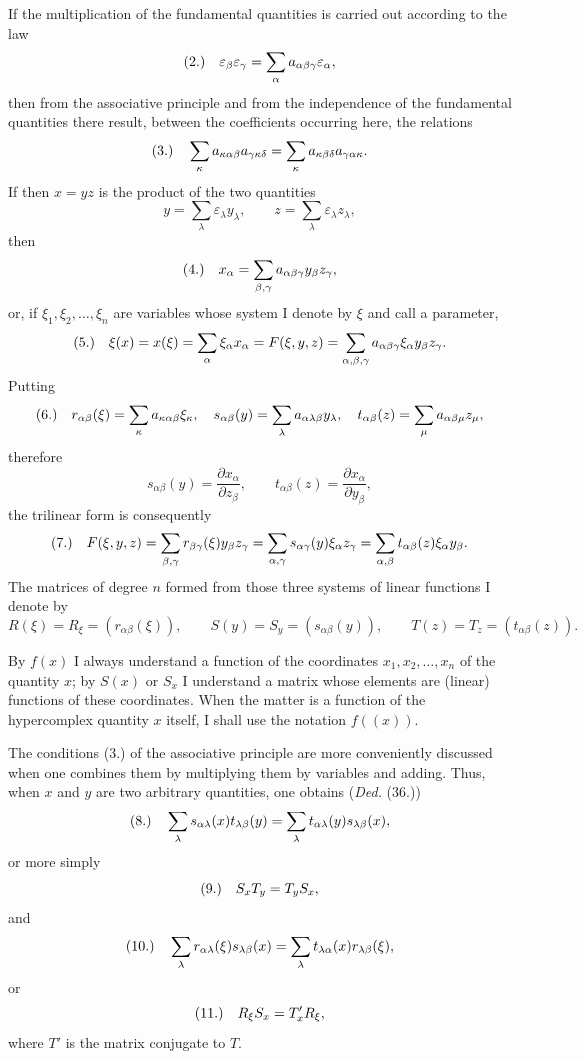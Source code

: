 \documentclass[11pt]{article}
\newcommand{\eps}{\varepsilon}
\newcommand{\fnum}[1]{\textup{(\ensuremath{#1}.)}\quad}
\begin{document}
If the multiplication of the fundamental quantities is carried out according to the law
\[
\fnum{2} \eps_\beta\eps_\gamma=\sum_\alpha a_{\alpha\beta\gamma}\eps_\alpha,
\]
then from the associative principle and from the independence of the fundamental quantities there result, between the coefficients occurring here, the relations
\[
\fnum{3} \sum_\kappa a_{\kappa\alpha\beta}a_{\gamma\kappa\delta}
      =\sum_\kappa a_{\kappa\beta\delta}a_{\gamma\alpha\kappa}.
\]
If then $x=yz$ is the product of the two quantities
\[
 y=\sum_\lambda\eps_\lambda y_\lambda,\qquad
 z=\sum_\lambda\eps_\lambda z_\lambda,
\]
then
\[
\fnum{4} x_\alpha=\sum_{\beta,\gamma}a_{\alpha\beta\gamma}y_\beta z_\gamma,
\]
or, if $\xi_1,\xi_2,\ldots,\xi_n$ are variables whose system I denote by $\xi$ and call a parameter,
\[
\fnum{5} \xi(x)=x(\xi)=\sum_\alpha \xi_\alpha x_\alpha
  =F(\xi,y,z)=\sum_{\alpha,\beta,\gamma}a_{\alpha\beta\gamma}\xi_\alpha y_\beta z_\gamma.
\]
Putting
\[
\fnum{6} r_{\alpha\beta}(\xi)=\sum_\kappa a_{\kappa\alpha\beta}\xi_\kappa,\quad
s_{\alpha\beta}(y)=\sum_\lambda a_{\alpha\lambda\beta}y_\lambda,\quad
t_{\alpha\beta}(z)=\sum_\mu a_{\alpha\beta\mu}z_\mu,
\]
therefore
\[
s_{\alpha\beta}(y)=\frac{\partial x_\alpha}{\partial z_\beta},\qquad
t_{\alpha\beta}(z)=\frac{\partial x_\alpha}{\partial y_\beta},
\]
the trilinear form is consequently
\[
\fnum{7} F(\xi,y,z)=\sum_{\beta,\gamma}r_{\beta\gamma}(\xi)y_\beta z_\gamma
=\sum_{\alpha,\gamma}s_{\alpha\gamma}(y)\xi_\alpha z_\gamma
=\sum_{\alpha,\beta}t_{\alpha\beta}(z)\xi_\alpha y_\beta .
\]
The matrices of degree $n$ formed from those three systems of linear functions I denote by
\[
 R(\xi)=R_\xi=(r_{\alpha\beta}(\xi)),\qquad
 S(y)=S_y=(s_{\alpha\beta}(y)),\qquad
 T(z)=T_z=(t_{\alpha\beta}(z)).
\]

By $f(x)$ I always understand a function of the coordinates $x_1,x_2,\ldots,x_n$ of the quantity $x$; by $S(x)$ or $S_x$ I understand a matrix whose elements are (linear) functions of these coordinates. When the matter is a function of the hypercomplex quantity $x$ itself, I shall use the notation $f((x))$.

The conditions (3.) of the associative principle are more conveniently discussed when one combines them by multiplying them by variables and adding. Thus, when $x$ and $y$ are two arbitrary quantities, one obtains (\emph{Ded.} (36.))
\[
\fnum{8} \sum_\lambda s_{\alpha\lambda}(x)t_{\lambda\beta}(y)
      =\sum_\lambda t_{\alpha\lambda}(y)s_{\lambda\beta}(x),
\]
or more simply
\[
\fnum{9} S_xT_y=T_yS_x,
\]
and
\[
\fnum{10} \sum_\lambda r_{\alpha\lambda}(\xi)s_{\lambda\beta}(x)
       =\sum_\lambda t_{\lambda\alpha}(x)r_{\lambda\beta}(\xi),
\]
or
\[
\fnum{11} R_\xi S_x=T'_xR_\xi,
\]
where $T'$ is the matrix conjugate to $T$.
\end{document}

